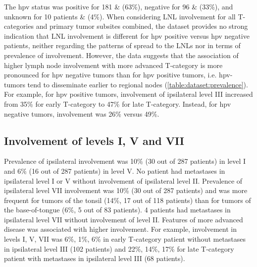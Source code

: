 \documentclass[\relativeRoot/main.tex]{subfiles}
\begin{document}
The \gls{hpv} status was positive for 181 \& (63\%), negative for 96 \& (33\%), and unknown for 10 patients \& (4\%). When considering LNL involvement for all T-categories and primary tumor subsites combined, the dataset provides no strong indication that LNL involvement is different for \gls{hpv} positive versus \gls{hpv} negative patients, neither regarding the patterns of spread to the LNLs nor in terms of prevalence of involvement. However, the data suggests that the association of higher lymph node involvement with more advanced T-category is more pronounced for \gls{hpv} negative tumors than for \gls{hpv} positive tumors, i.e. \gls{hpv}-tumors tend to disseminate earlier to regional nodes (\cref{table:dataset:prevalence}). For example, for \gls{hpv} positive tumors, involvement of ipsilateral level III increased from 35\% for early T-category to 47\% for late T-category. Instead, for \gls{hpv} negative tumors, involvement was 26\% versus 49\%.

\subsection*{Involvement of levels I, V and VII}

Prevalence of ipsilateral involvement was 10\% (30 out of 287 patients) in level I and 6\% (16 out of 287 patients) in level V. No patient had metastases in ipsilateral level I or V without involvement of ipsilateral level II. Prevalence of ipsilateral level VII involvement was 10\% (30 out of 287 patients) and was more frequent for tumors of the tonsil (14\%, 17 out of 118 patients) than for tumors of the base-of-tongue (6\%, 5 out of 83 patients). 4 patients had metastases in ipsilateral level VII without involvement of level II. Features of more advanced disease was associated with higher involvement. For example, involvement in levels I, V, VII was 6\%, 1\%, 6\% in early T-category patient without metastases in ipsilateral level III (102 patients) and 22\%, 14\%, 17\% for late T-category patient with metastases in ipsilateral level III (68 patients).
\end{document}
